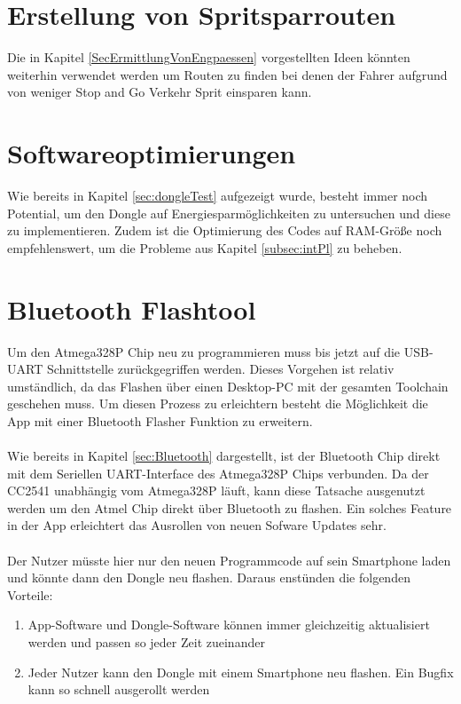 \section{Erstellung von Spritsparrouten}
Die in Kapitel \ref{SecErmittlungVonEngpaessen} vorgestellten Ideen könnten weiterhin verwendet werden um Routen zu finden bei denen der Fahrer aufgrund von weniger Stop and Go Verkehr Sprit einsparen kann.

\section{Softwareoptimierungen}
Wie bereits in Kapitel \ref{sec:dongleTest} aufgezeigt wurde, besteht immer noch Potential, um den Dongle auf Energiesparmöglichkeiten zu untersuchen und diese zu implementieren. Zudem ist die Optimierung des Codes auf RAM-Größe noch empfehlenswert, um die Probleme aus Kapitel \ref{subsec:intPl} zu beheben.

\section{Bluetooth Flashtool}
Um den Atmega328P Chip neu zu programmieren muss bis jetzt auf die USB-UART Schnittstelle zurückgegriffen werden. Dieses Vorgehen ist relativ umständlich, da das Flashen über einen Desktop-PC mit der gesamten Toolchain geschehen muss. Um diesen Prozess zu erleichtern besteht die Möglichkeit die App mit einer Bluetooth Flasher Funktion zu erweitern.
\paragraph{}
Wie bereits in Kapitel \ref{sec:Bluetooth} dargestellt, ist der Bluetooth Chip direkt mit dem Seriellen UART-Interface des Atmega328P Chips verbunden. Da der CC2541 unabhängig vom Atmega328P läuft, kann diese Tatsache ausgenutzt werden um den Atmel Chip direkt über Bluetooth zu flashen. Ein solches Feature in der App erleichtert das Ausrollen von neuen Sofware Updates sehr.
\paragraph{}
Der Nutzer müsste hier nur den neuen Programmcode auf sein Smartphone laden und könnte dann den Dongle neu flashen. 
Daraus enstünden die folgenden Vorteile: 
\begin{enumerate}
	\item App-Software und Dongle-Software können immer gleichzeitig aktualisiert werden und passen so jeder Zeit zueinander
	\item Jeder Nutzer kann den Dongle mit einem Smartphone neu flashen. Ein Bugfix kann so schnell ausgerollt werden 
\end{enumerate}
